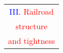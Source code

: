 \documentclass[%
pdf,
colorBG,
slideColor,
]{prosper}
\begin{document}
%








\begin{slide}{}
\begin{center}
{\Huge 
\begin{tabular*}{6.2cm}{c}
\\[-0.6cm]
\textcolor{blue}{III. }\textcolor{red}{Railroad}\\
\textcolor{red}{structure}\\
\textcolor{red}{and tightness}
\end{tabular*}
}
\end{center}
\end{slide}
\end{document}
